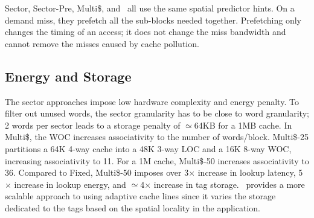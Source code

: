 {{Sector, Sector-Pre, Multi\$, and \AC\ all use the same spatial predictor hints. On a demand miss, they prefetch all the sub-blocks needed together. Prefetching only changes the timing of an access; it does not change the miss bandwidth and cannot remove the misses caused by cache pollution.

\subsection{Energy and Storage}
The sector approaches impose low hardware complexity and energy penalty. To filter out unused words, the sector granularity has to be close to word granularity; 2 words per sector leads to a storage penalty of $\simeq$64KB for a 1MB cache. In Multi\$, the WOC increases associativity to the number of words/block.  Multi\$-25 partitions a 64K 4-way cache into a 48K 3-way LOC and a 16K 8-way WOC, increasing associativity to 11. For a 1M cache, Multi\$-50 increases associativity to 36.  Compared to Fixed, Multi\$-50 imposes over 3$\times$ increase in lookup latency, 5$\times$ increase in lookup energy, and $\simeq$4$\times$ increase in tag storage. \AC\ provides a more scalable approach to using adaptive cache lines since it varies the storage dedicated to the tags based on the spatial locality in the application.

\begin{figure}[!ht]


\end{figure}}}
